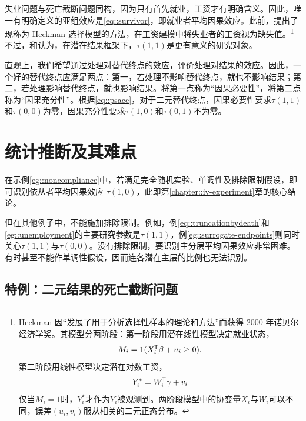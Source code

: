 \begin{example}[失业问题]
失业问题与死亡截断问题同构，因为只有首先就业，工资才有明确含义。因此，唯一有明确定义的亚组效应是\eqref{eq::survivor}，即就业者平均因果效应。此前，\citet{heckman1979sample}提出了现称为 Heckman 选择模型的方法，在工资建模中将失业者的工资视为缺失值。\footnote{Heckman 因“发展了用于分析选择性样本的理论和方法”而获得 2000 年诺贝尔经济学奖。其模型分两阶段：第一阶段用潜在线性模型决定就业状态，
$$
M_i = 1(X_i^{\mkern-1.5mu\mathsf{T}} \beta + u_i \geq 0).
$$
第二阶段用线性模型决定潜在对数工资，
$$
Y_i^* = W_i^{\mkern-1.5mu\mathsf{T}} \gamma + v_i
$$
仅当$M_i = 1$时，$Y_i^*$才作为$Y_i$被观测到。两阶段模型中的协变量$X_i$与$W_i$可以不同，误差$(u_i , v_i)$服从相关的二元正态分布。}不过，\citet{zhang2003estimation}和\citet{zhang2009likelihood}认为，在潜在结果框架下，$\tau(1,1)$是更有意义的研究对象。 
\end{example} 



\begin{example}[替代终点]
直观上，我们希望通过处理对替代终点的效应，评价处理对结果的效应。因此，一个好的替代终点应满足两点：第一，若处理不影响替代终点，就也不影响结果；第二，若处理影响替代终点，就也影响结果。\citet{frangakis2002principal}将第一点称为“因果必要性”，\citet{gilbert2008evaluating}将第二点称为“因果充分性”。根据\eqref{eq::psace}，对于二元替代终点，因果必要性要求$\tau(1,1)$和$\tau(0,0)$为零，因果充分性要求$\tau(1,0)$和$\tau(0,1)$不为零。 
\end{example}





\section{统计推断及其难点}
\label{sec::difficulty-of-PS}

在示例\ref{eg::noncompliance}中，若满足完全随机实验、单调性及排除限制假设，即可识别依从者平均因果效应 $\tau(1, 0)$，此即第\ref{chapter::iv-experiment}章的核心结论。


但在其他例子中，不能施加排除限制。例如，例\ref{eq::truncationbydeath}和\ref{eg::unemployment}的主要研究参数是$\tau(1,1)$，例\ref{eg::surrogate-endpoints}则同时关心$\tau(1,1)$与$\tau(0,0)$。没有排除限制，要识别主分层平均因果效应非常困难。有时甚至不能作单调性假设，因而连各潜在主层的比例也无法识别。 




\subsection{特例：二元结果的死亡截断问题}

